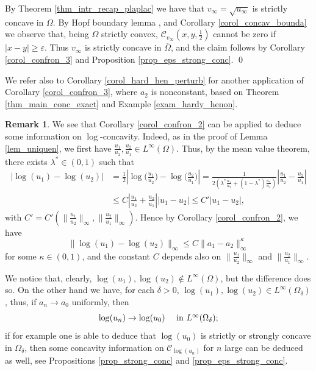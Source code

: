 \documentclass[11pt, reqno]{amsart}
\theoremstyle{definition}
\newtheorem{remark}[lemma]{Remark}
\numberwithin{equation}{section}
\newcommand{\mc}[1]{\mathcal{#1}}
\def\eps{\varepsilon}
\def\pabs#1{\left|{#1}\right|}
\def\norm#1{\|#1\|}
\renewenvironment{proof}[1][\proofname]{\medskip \noindent {\bfseries #1. }}{\qed \bigskip}
\begin{document}
\begin{proof}
By Theorem \ref{thm_intr_recap_plaplac} we have that $v_{\infty}=\sqrt{u_{\infty}}$ is strictly concave in $\Omega$. 
By Hopf boundary lemma \cite[Theorem 5]{Vaz84}, and Corollary \ref{corol_concav_bounda} we observe that, being $\Omega$ strictly convex, $\mc{C}_{v_{\infty}}(x,y,\frac{1}{2})$ cannot be zero if $|x-y|\geq \eps$. 
Thus $v_{\infty}$ is strictly concave in $\overline{\Omega}$, and the claim follows by Corollary \ref{corol_confron_3} and Proposition \ref{prop_eps_strong_conc}.
\end{proof}

We refer also to Corollary \ref{corol_hard_hen_perturb} for another application of Corollary \ref{corol_confron_3}, where $a_2$ is nonconstant, based on Theorem \ref{thm_main_conc_exact} and Example \ref{exam_hardy_henon}. 

\begin{remark}
\label{rem_diff_log}
We see that Corollary \ref{corol_confron_2} can be applied to deduce some information on $\log$-concavity. 
Indeed, as in the proof of Lemma \ref{lem_uniquen}, we first have $\frac{u_1}{u_2}, \frac{u_2}{u_1} \in L^{\infty}(\Omega)$.
Thus, by the mean value theorem, there exists $\lambda^* \in (0,1)$ such that
\begin{align*}
\pabs{\log(u_1)-\log(u_2)} &= \tfrac{1}{2}\pabs{\log\big(\tfrac{u_1}{u_2}\big) - \log\big(\tfrac{u_2}{u_1}\big)} 
 = \frac{1}{2(\lambda^*\frac{u_1}{u_2} + (1-\lambda^*) \frac{u_2}{u_1})} \pabs{\tfrac{u_1}{u_2} - \tfrac{u_2}{u_1}} \\
 & \leq C \pabs{\tfrac{u_1}{u_2} + \tfrac{u_2}{u_1}} |u_1-u_2|
 \leq C' |u_1-u_2|,
\end{align*}
with $C' = C'(\norm{\frac{u_1}{u_2}}_{\infty}, \norm{\frac{u_2}{u_1}}_{\infty})$. 
Hence by Corollary \ref{corol_confron_2}, we have
$$\norm{\log(u_1)-\log(u_2)}_{\infty} \leq C \norm{a_1 -a_2}_{\infty}^{\kappa}$$
for some $\kappa \in (0,1)$, and the constant $C$ depends also on $\norm{\frac{u_1}{u_2}}_{\infty}$ and $\norm{\frac{u_2}{u_1}}_{\infty}$.

We notice that, clearly, $\log(u_1), \log(u_2) \notin L^{\infty}(\Omega)$, but the difference does so. On the other hand we have, for each $\delta>0$, $\log(u_1), \log(u_2) \in L^{\infty}(\Omega_{\delta})$, thus, if $a_n \to a_0$ uniformly, then
$$\log(u_n) \to \log(u_0) \quad \hbox{ in $L^{\infty}(\Omega_{\delta})$};$$
if for example one is able to deduce that $\log(u_0)$ is strictly or strongly concave in $\Omega_{\delta}$, then some concavity information on $\mc{C}_{\log(u_n)}$ for $n$ large can be deduced as well, see Propositions \ref{prop_strong_conc} and \ref{prop_eps_strong_conc}. 
\end{remark}
\end{document}
